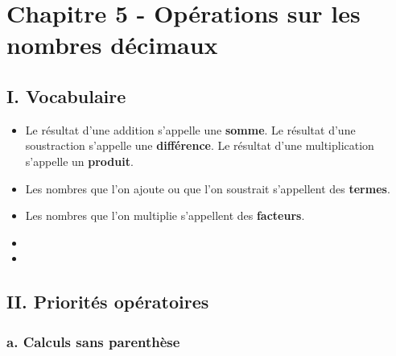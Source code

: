 \section*{Chapitre 5 - Opérations sur les nombres décimaux}

\subsection*{I. Vocabulaire}

\begin{Définition*}[c]
\leavevmode\vspace{-\baselineskip}
\begin{itemize}[label=\textcolor{Couleur6}{$\bullet$}]
\item Le résultat d'une addition s'appelle une \textbf{somme}. Le résultat d'une soustraction s'appelle une \textbf{différence}. Le résultat d'une multiplication s'appelle un \textbf{produit}.
\item Les nombres que l'on ajoute ou que l'on soustrait s'appellent des \textbf{termes}.
\item Les nombres que l'on multiplie s'appellent des \textbf{facteurs}.
\end{itemize}
\end{Définition*}

\begin{Exemples}
\begin{itemize}[label=\textcolor{Couleur8}{$\bullet$}]
\item \ligne

\item \ligne

\end{itemize}
\end{Exemples}

\subsection*{II. Priorités opératoires}
\subsubsection*{a. Calculs sans parenthèse}

